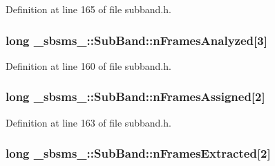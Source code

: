 Definition at line 165 of file subband.\+h.

\subsubsection[{\texorpdfstring{n\+Frames\+Analyzed}{nFramesAnalyzed}}]{\setlength{\rightskip}{0pt plus 5cm}long \+\_\+sbsms\+\_\+\+::\+Sub\+Band\+::n\+Frames\+Analyzed\mbox{[}3\mbox{]}\hspace{0.3cm}{\ttfamily [protected]}}\hypertarget{class__sbsms___1_1_sub_band_aca0eeb8204a9f8a51eb82d848f0fd2eb}{}\label{class__sbsms___1_1_sub_band_aca0eeb8204a9f8a51eb82d848f0fd2eb}


Definition at line 160 of file subband.\+h.

\subsubsection[{\texorpdfstring{n\+Frames\+Assigned}{nFramesAssigned}}]{\setlength{\rightskip}{0pt plus 5cm}long \+\_\+sbsms\+\_\+\+::\+Sub\+Band\+::n\+Frames\+Assigned\mbox{[}2\mbox{]}\hspace{0.3cm}{\ttfamily [protected]}}\hypertarget{class__sbsms___1_1_sub_band_a5911cf25796dd2d81a7f9842d1e868d6}{}\label{class__sbsms___1_1_sub_band_a5911cf25796dd2d81a7f9842d1e868d6}


Definition at line 163 of file subband.\+h.

\subsubsection[{\texorpdfstring{n\+Frames\+Extracted}{nFramesExtracted}}]{\setlength{\rightskip}{0pt plus 5cm}long \+\_\+sbsms\+\_\+\+::\+Sub\+Band\+::n\+Frames\+Extracted\mbox{[}2\mbox{]}\hspace{0.3cm}{\ttfamily [protected]}}\hypertarget{class__sbsms___1_1_sub_band_a79c56e48c1dc7760051c9ddff4401fd1}{}\label{class__sbsms___1_1_sub_band_a79c56e48c1dc7760051c9ddff4401fd1}


